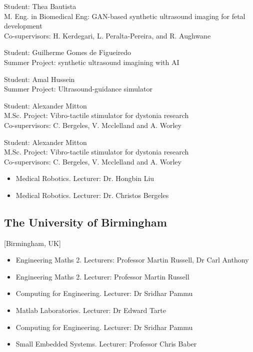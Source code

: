 \documentclass{mycv}
\begin{document}
Student: Thea Bautista  \\
M. Eng. in Biomedical Eng: GAN-based synthetic ultrasound imaging for fetal development \\
Co-supervisors: H. Kerdegari, L. Peralta-Pereira, and R. Aughwane

Student: Guilherme Gomes de Figueiredo  \\
Summer Project: synthetic ultrasound imagining with AI

Student: Amal Hussein  \\
Summer Project: Ultrasound-guidance simulator

Student: Alexander Mitton  \\
M.Sc. Project: Vibro-tactile stimulator for dystonia research \\
Co-supervisors: C. Bergeles, V. Mcclelland and A. Worley

Student: Alexander Mitton  \\
M.Sc. Project: Vibro-tactile stimulator for dystonia research \\
Co-supervisors: C. Bergeles, V. Mcclelland and A. Worley 

\begin{positions}
\end{positions}
\begin{itemize}
	\item Medical Robotics. Lecturer: Dr. Hongbin Liu 
	\item Medical Robotics. Lecturer: Dr. Christos Bergeles 
\end{itemize}
\vspace{\parskip}


\subsection{The University of Birmingham}[Birmingham, UK]
\begin{positions}
\end{positions}
\begin{itemize}
	\item Engineering Maths 2. Lecturers: Professor Martin Russell, Dr Carl Anthony 
	\item Engineering Maths 2. Lecturer: Professor Martin Russell 
	\item Computing for Engineering. Lecturer: Dr Sridhar Pammu  
	\item Matlab Laboratories. Lecturer: Dr Edward Tarte  
	\item Computing for Engineering. Lecturer: Dr Sridhar Pammu  
	\item Small Embedded Systems. Lecturer: Professor Chris Baber   \\
\end{itemize}
\end{document}
